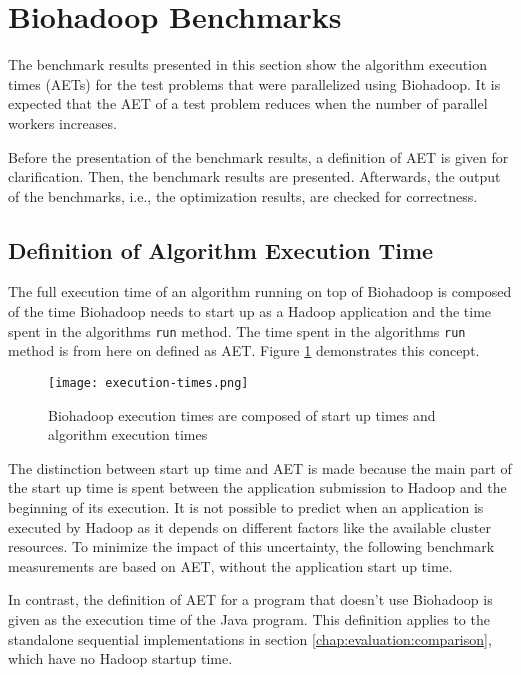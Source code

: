 \section{Biohadoop Benchmarks}
\label{chap:evaluation:benchmarks}
The benchmark results presented in this section show the algorithm execution times (AETs) for the test problems that were parallelized using Biohadoop. It is expected that the AET of a test problem reduces when the number of parallel workers increases.

Before the presentation of the benchmark results, a definition of AET is given for clarification. Then, the benchmark results are presented. Afterwards, the output of the benchmarks, i.e., the optimization results, are checked for correctness.

\subsection{Definition of Algorithm Execution Time}
\label{chap:evaluation:exec-definition}
The full execution time of an algorithm running on top of Biohadoop is composed of the time Biohadoop needs to start up as a Hadoop application and the time spent in the algorithms \texttt{run} method. The time spent in the algorithms \texttt{run} method is from here on defined as AET. Figure \ref{fig:execution-times} demonstrates this concept.

\begin{figure}
  \centering
  \texttt{[image: execution-times.png]}
  \caption[Division of Biohadoop execution times]{Biohadoop execution times are composed of start up times and algorithm execution times}
  \label{fig:execution-times}
\end{figure}

The distinction between start up time and AET is made because the main part of the start up time is spent between the application submission to Hadoop and the beginning of its execution. It is not possible to predict when an application is executed by Hadoop as it depends on different factors like the available cluster resources. To minimize the impact of this uncertainty, the following benchmark measurements are based on AET, without the application start up time.

In contrast, the definition of AET for a program that doesn't use Biohadoop is given as the execution time of the Java program. This definition applies to the standalone sequential implementations in section \ref{chap:evaluation:comparison}, which have no Hadoop startup time.


